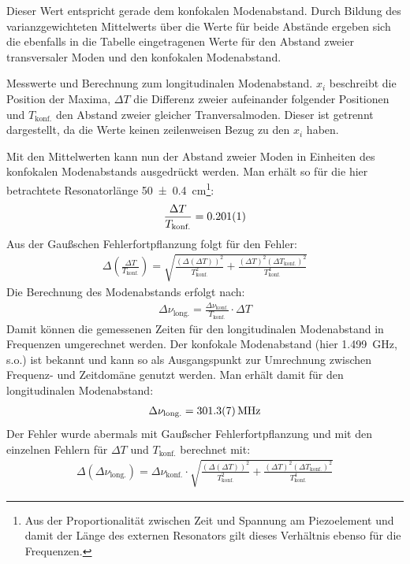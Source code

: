 \documentclass[11pt, a4paper]{article}
\numberwithin{equation}{section}
\begin{document}
Dieser Wert entspricht gerade dem konfokalen Modenabstand.
Durch Bildung des varianzgewichteten Mittelwerts über die Werte für beide Abstände ergeben sich die ebenfalls in die Tabelle eingetragenen Werte für den Abstand zweier transversaler Moden und den konfokalen Modenabstand. 
\begin{table}[h]
\centering
\resizebox{\columnwidth}{!}{%
}
\caption{Messwerte und Berechnung zum longitudinalen Modenabstand. $x_i$ beschreibt die Position der Maxima, $\Delta T$ die Differenz zweier aufeinander folgender Positionen und $T_\text{konf.}$ den Abstand zweier gleicher Tranversalmoden. Dieser ist getrennt dargestellt, da die Werte keinen zeilenweisen Bezug zu den $x_i$ haben.}
\label{tab:ALL0028}
\end{table}
Mit den Mittelwerten kann nun der Abstand zweier Moden in Einheiten des konfokalen Modenabstands ausgedrückt werden.
Man erhält so für die hier betrachtete Resonatorlänge \SI{50+-0.4}{\centi\metre}\footnote{Aus der Proportionalität zwischen Zeit und Spannung am Piezoelement und damit der Länge des externen Resonators gilt dieses Verhältnis ebenso für die Frequenzen.}:
\begin{align}
\frac{\Delta T}{T_\text{konf.}}= \num{0.201+-0.001}
\end{align}
Aus der Gaußschen Fehlerfortpflanzung folgt für den Fehler:
\begin{align}
\Delta\left(\frac{\Delta T}{T_\text{konf.}}\right)=\sqrt{\frac{(\Delta(\Delta T))^2}{T_\text{konf.}^2}+\frac{(\Delta T)^2(\Delta T_\text{konf.})^2}{T_\text{konf.}^4}}
\end{align}
Die Berechnung des Modenabstands erfolgt nach:
\begin{align}
\Delta\nu_\text{long.}=\frac{\Delta\nu_\text{konf.}}{T_\text{konf.}} \cdot \Delta T 
\end{align}
Damit können die gemessenen Zeiten für den longitudinalen Modenabstand in Frequenzen umgerechnet werden.
Der konfokale Modenabstand (hier \SI{1.499}{\giga\hertz}, s.o.) ist bekannt und kann so als Ausgangspunkt zur Umrechnung zwischen Frequenz- und Zeitdomäne genutzt werden.
Man erhält damit für den longitudinalen Modenabstand:
\begin{align}
\Delta\nu_\text{long.}=\SI{301.3+-0.7}{\mega\hertz}
\end{align}
Der Fehler wurde abermals mit Gaußscher Fehlerfortpflanzung und mit den einzelnen Fehlern für $\Delta T$ und $T_\text{konf.}$ berechnet mit:
\begin{align}
\Delta\left(\Delta\nu_\text{long.}\right)=\Delta\nu_\text{konf.}\cdot\sqrt{\frac{(\Delta(\Delta T))^2}{T_\text{konf.}^2}+\frac{(\Delta T)^2(\Delta T_\text{konf.})^2}{T_\text{konf.}^4}}
\end{align}
\end{document}
